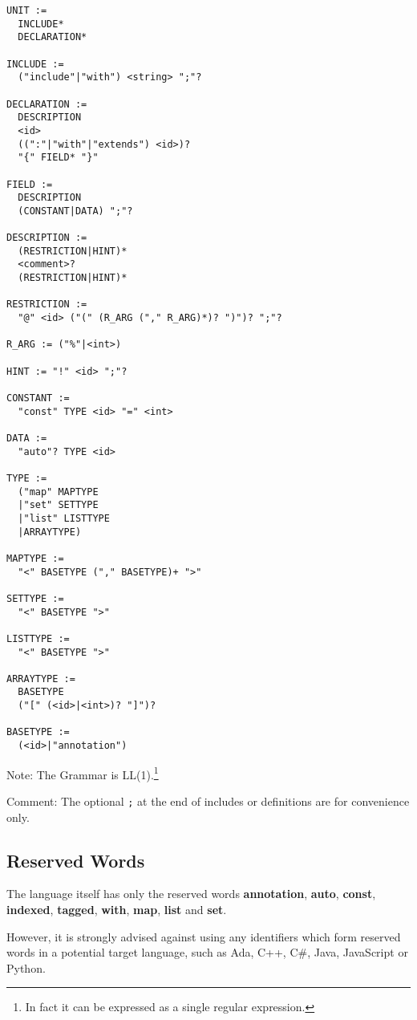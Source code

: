 \documentclass[a4paper,10pt]{article}
\begin{document}
\begin{verbatim}
UNIT :=
  INCLUDE*
  DECLARATION*

INCLUDE := 
  ("include"|"with") <string> ";"?

DECLARATION :=
  DESCRIPTION
  <id>
  ((":"|"with"|"extends") <id>)?
  "{" FIELD* "}"
  
FIELD :=
  DESCRIPTION
  (CONSTANT|DATA) ";"?
  
DESCRIPTION := 
  (RESTRICTION|HINT)*
  <comment>?
  (RESTRICTION|HINT)*
  
RESTRICTION :=
  "@" <id> ("(" (R_ARG ("," R_ARG)*)? ")")? ";"?
  
R_ARG := ("%"|<int>)

HINT := "!" <id> ";"?
  
CONSTANT :=
  "const" TYPE <id> "=" <int>
  
DATA :=
  "auto"? TYPE <id>
  
TYPE :=
  ("map" MAPTYPE
  |"set" SETTYPE
  |"list" LISTTYPE
  |ARRAYTYPE)
  
MAPTYPE :=
  "<" BASETYPE ("," BASETYPE)+ ">"
  
SETTYPE :=
  "<" BASETYPE ">"
  
LISTTYPE :=
  "<" BASETYPE ">"
  
ARRAYTYPE :=
  BASETYPE
  ("[" (<id>|<int>)? "]")?
  
BASETYPE :=
  (<id>|"annotation")

\end{verbatim}
Note: The Grammar is LL(1).\footnote{In fact it can be expressed as a single regular expression.}

Comment: The optional \texttt{;} at the end of includes or definitions are for convenience only.

\subsection{Reserved Words}

The language itself has only the reserved words \textbf{annotation}, \textbf{auto}, \textbf{const}, \textbf{indexed}, \textbf{tagged}, \textbf{with}, \textbf{map}, \textbf{list} and \textbf{set}.

However, it is strongly advised against using any identifiers which form reserved words in a potential target language, such as Ada, C++, C\#, Java, JavaScript or Python.
\end{document}

